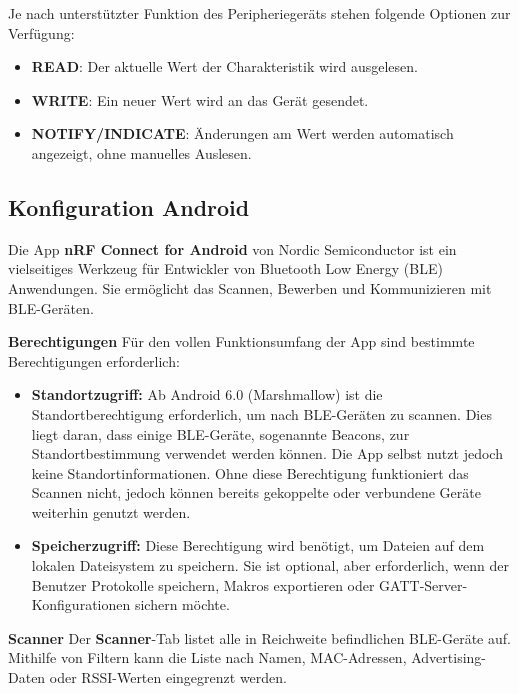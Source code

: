 \vspace{1\baselineskip}

Je nach unterstützter Funktion des Peripheriegeräts stehen folgende Optionen zur Verfügung:
\begin{itemize}
    \item \textbf{READ}: Der aktuelle Wert der Charakteristik wird ausgelesen.
    
    \item \textbf{WRITE}: Ein neuer Wert wird an das Gerät gesendet.
    
    \item \textbf{NOTIFY/INDICATE}: Änderungen am Wert werden automatisch angezeigt, ohne manuelles Auslesen.
\end{itemize}

\subsection{Konfiguration Android}
Die App \textbf{nRF Connect for Android} von Nordic Semiconductor ist ein vielseitiges Werkzeug für Entwickler von Bluetooth Low Energy (BLE) Anwendungen. Sie ermöglicht das Scannen, Bewerben und Kommunizieren mit BLE-Geräten.
\cite{Philips:Mobile:Android}

\textbf{Berechtigungen}
Für den vollen Funktionsumfang der App sind bestimmte Berechtigungen erforderlich:

\begin{itemize}
    \item \textbf{Standortzugriff:} Ab Android 6.0 (Marshmallow) ist die Standortberechtigung erforderlich, um nach BLE-Geräten zu scannen. Dies liegt daran, dass einige BLE-Geräte, sogenannte Beacons, zur Standortbestimmung verwendet werden können. Die App selbst nutzt jedoch keine Standortinformationen. Ohne diese Berechtigung funktioniert das Scannen nicht, jedoch können bereits gekoppelte oder verbundene Geräte weiterhin genutzt werden.
    
    \item \textbf{Speicherzugriff:} Diese Berechtigung wird benötigt, um Dateien auf dem lokalen Dateisystem zu speichern. Sie ist optional, aber erforderlich, wenn der Benutzer Protokolle speichern, Makros exportieren oder GATT-Server-Konfigurationen sichern möchte.
\end{itemize}

\vspace{1\baselineskip}

\textbf{Scanner}
Der \textbf{Scanner}-Tab listet alle in Reichweite befindlichen BLE-Geräte auf. Mithilfe von Filtern kann die Liste nach Namen, MAC-Adressen, Advertising-Daten oder RSSI-Werten eingegrenzt werden.
\cite{Philips:Mobile:Android}

